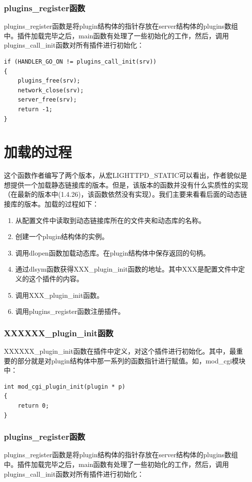 \documentclass[12pt, dvipdfm]{article}
\begin{document}
\subsubsection{plugins\_register函数}
plugins\_register函数是将plugin结构体的指针存放在server结构体的plugins数组中。插件加载完毕之后，main函数有处理了一些初始化的工作，然后，调用plugins\_call\_init函数对所有插件进行初始化：

\begin{verbatim}
if (HANDLER_GO_ON != plugins_call_init(srv)) 
{
	plugins_free(srv);
	network_close(srv);
	server_free(srv);
	return -1;
}
\end{verbatim}

\section{加载的过程}
这个函数作者编写了两个版本，从宏LIGHTTPD\_STATIC可以看出，作者貌似是想提供一个加载静态链接库的版本。但是，该版本的函数并没有什么实质性的实现（在最新的版本中(1.4.26)，该函数依然没有实现）。我们主要来看看后面的动态链接库的版本。加载的过程如下：
\begin{enumerate}
	\item 从配置文件中读取到动态链接库所在的文件夹和动态库的名称。
	\item 创建一个plugin结构体的实例。
	\item 调用dlopen函数加载动态库。在plugin结构体中保存返回的句柄。
	\item 通过dlsym函数获得XXX\_plugin\_init函数的地址。其中XXX是配置文件中定义的这个插件的内容。
	\item 调用XXX\_plugin\_init函数。
	\item 调用plugins\_register函数注册插件。
\end{enumerate}

\subsubsection{XXXXXX\_plugin\_init函数}
XXXXXX\_plugin\_init函数在插件中定义，对这个插件进行初始化。其中，最重要的部分就是对plugin结构体中那一系列的函数指针进行赋值。如，mod\_cgi模块中：

\begin{verbatim}
int mod_cgi_plugin_init(plugin * p)
{
	return 0;
}
\end{verbatim}


\subsubsection{plugins\_register函数}
plugins\_register函数是将plugin结构体的指针存放在server结构体的plugins数组中。插件加载完毕之后，main函数有处理了一些初始化的工作，然后，调用plugins\_call\_init函数对所有插件进行初始化：
\end{document}
